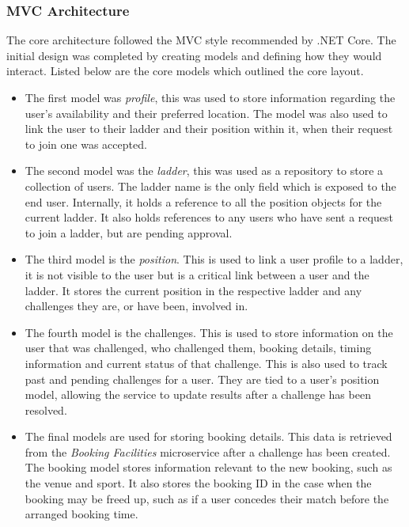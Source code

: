 \subsubsection{MVC Architecture}
\par
The core architecture followed the MVC style recommended by .NET Core. The initial design was completed by creating models and defining how they would interact. Listed below are the core models which outlined the core layout.

\begin{itemize}

	\item The first model was \textit{profile}, this was used to store information regarding the user's availability and their preferred location. The model was also used to link the user to their ladder and their position within it, when their request to join one was accepted.

	\item The second model was the \textit{ladder}, this was used as a repository to store a collection of users. The ladder name is the only field which is exposed to the end user. Internally, it holds a reference to all the position objects for the current ladder. It also holds references to any users who have sent a request to join a ladder, but are pending approval.

	\item The third model is the \textit{position}. This is used to link a user profile to a ladder, it is not visible to the user but is a critical link between a user and the ladder. It stores the current position in the respective ladder and any challenges they are, or have been, involved in.

	\item The fourth model is the challenges. This is used to store information on the user that was challenged, who challenged them, booking details, timing information and current status of that challenge. This is also used to track past and pending challenges for a user. They are tied to a user’s position model, allowing the service to update results after a challenge has been resolved.

	\item The final models are used for storing booking details. This data is retrieved from the \textit{Booking Facilities} microservice after a challenge has been created. The booking model stores information relevant to the new booking, such as the venue and sport. It also stores the booking ID in the case when the booking may be freed up, such as if a user concedes their match before the arranged booking time.

\end{itemize}


